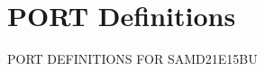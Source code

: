 \hypertarget{group___s_a_m_d21_e15_b_u__port}{}\section{P\+O\+RT Definitions}
\label{group___s_a_m_d21_e15_b_u__port}
P\+O\+RT D\+E\+F\+I\+N\+I\+T\+I\+O\+NS F\+OR S\+A\+M\+D21\+E15\+BU 
